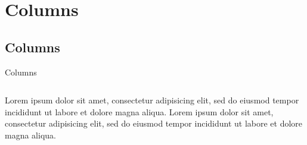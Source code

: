\section{Columns}
\subsection{Columns}
\label{columns}
\begin{frame}{Columns}
  \begin{columns}
      Lorem ipsum dolor sit amet, consectetur adipisicing elit, sed do eiusmod tempor incididunt ut labore et dolore magna aliqua.
      Lorem ipsum dolor sit amet, consectetur adipisicing elit, sed do eiusmod tempor incididunt ut labore et dolore magna aliqua.
  \end{columns}
\end{frame}
